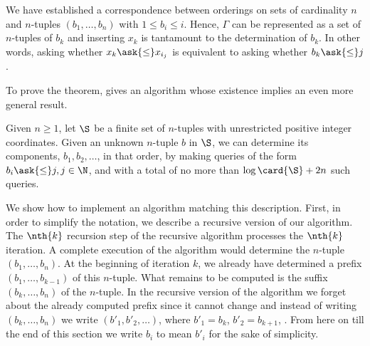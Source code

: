 We have established a correspondence between orderings on sets of cardinality
$n$ and $n$-tuples $(b_1, \ldots, b_n)$ with $1 \le b_i \le i$. Hence, $\Gamma$
can be represented as a set of $n$-tuples of $b_k$ and inserting $x_k$ is
tantamount to the determination of $b_k$. In other words, asking whether $x_k
\ask{\le} x_{i_j}$ is equivalent to asking whether $b_k \ask{\le} j$.

To prove the theorem, \citet{fredman:1976} gives an algorithm whose existence
implies an even more general result.
\begin{lemma}
Given $n \ge 1$, let $\S$ be a finite set of $n$-tuples with unrestricted
positive integer coordinates. Given an unknown $n$-tuple \(b\) in $\S$, we can
determine its components, \(b_1, b_2, \ldots\), in that order, by making queries
of the form \(b_i \ask{\le} j, j \in \N\), and with a total of no more than $\log \card{\S}
+ 2n$ such queries.
\end{lemma}
We show how to implement an algorithm matching this description. First, in
order to simplify the notation, we describe a recursive version of our
algorithm. The $\nth{k}$ recursion step of the recursive algorithm processes
the $\nth{k}$ iteration. A complete execution of the algorithm would determine
the $n$-tuple $(b_1, \ldots, b_n)$.  At the beginning of iteration $k$, we
already have determined a prefix $(b_1, \ldots, b_{k-1})$ of this $n$-tuple.
What remains to be computed is the suffix $(b_k, \ldots, b_n)$ of the
$n$-tuple. In the recursive version of the algorithm we forget about the
already computed prefix since it cannot change and instead of writing $(b_k,
\ldots, b_n)$ we write $(b'_1, b'_2, \ldots)$, where $b'_1 = b_k$, $b'_2 =
b_{k+1}$, \etc. From here on till the end of this section we write $b_i$ to
mean $b'_i$ for the sake of simplicity.

